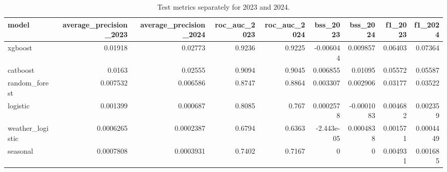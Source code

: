 \begin{table}
\caption{Test metrics separately for 2023 and 2024.}
\label{tab:T3_test_by_year}
\begin{tabular}{lrrrrrrrr}
\toprule
model & average_precision_2023 & average_precision_2024 & roc_auc_2023 & roc_auc_2024 & bss_2023 & bss_2024 & f1_2023 & f1_2024 \\
\midrule
xgboost & 0.01918 & 0.02773 & 0.9236 & 0.9225 & -0.006044 & 0.009857 & 0.06403 & 0.07364 \\
catboost & 0.0163 & 0.02555 & 0.9094 & 0.9045 & 0.006855 & 0.01095 & 0.05572 & 0.05587 \\
random_forest & 0.007532 & 0.006586 & 0.8747 & 0.8864 & 0.003307 & 0.002906 & 0.03177 & 0.03522 \\
logistic & 0.001399 & 0.000687 & 0.8085 & 0.767 & 0.0002578 & -0.0001083 & 0.004682 & 0.002359 \\
weather_logistic & 0.0006265 & 0.0002387 & 0.6794 & 0.6363 & -2.443e-05 & 0.0004838 & 0.001571 & 0.0004449 \\
seasonal & 0.0007808 & 0.0003931 & 0.7402 & 0.7167 & 0 & 0 & 0.004931 & 0.001685 \\
\bottomrule
\end{tabular}
\end{table}
